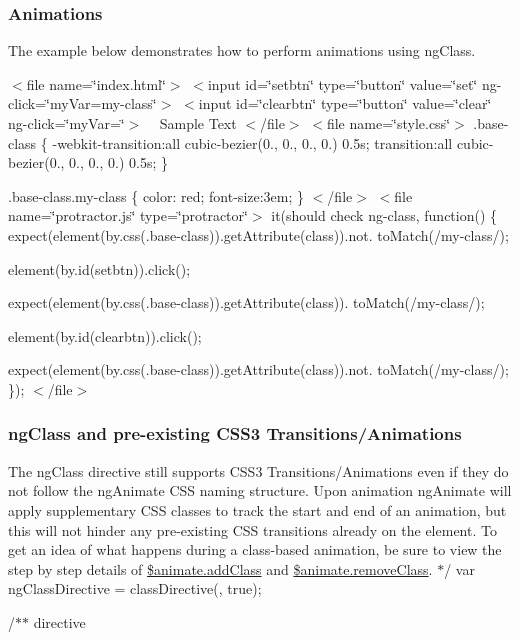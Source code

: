 \subsubsection*{Animations}

The example below demonstrates how to perform animations using ng\+Class.

$<$file name=\char`\"{}index.\+html\char`\"{}$>$ $<$input id=\char`\"{}setbtn\char`\"{} type=\char`\"{}button\char`\"{} value=\char`\"{}set\char`\"{} ng-\/click=\char`\"{}my\+Var=\textquotesingle{}my-\/class\textquotesingle{}\char`\"{}$>$ $<$input id=\char`\"{}clearbtn\char`\"{} type=\char`\"{}button\char`\"{} value=\char`\"{}clear\char`\"{} ng-\/click=\char`\"{}my\+Var=\textquotesingle{}\textquotesingle{}\char`\"{}$>$ ~\newline
 Sample Text $<$/file$>$ $<$file name=\char`\"{}style.\+css\char`\"{}$>$ .base-\/class \{ -\/webkit-\/transition\+:all cubic-\/bezier(0., 0., 0., 0.) 0.\+5s; transition\+:all cubic-\/bezier(0., 0., 0., 0.) 0.\+5s; \}

.base-\/class.\+my-\/class \{ color\+: red; font-\/size\+:3em; \} $<$/file$>$ $<$file name=\char`\"{}protractor.\+js\char`\"{} type=\char`\"{}protractor\char`\"{}$>$ it(\textquotesingle{}should check ng-\/class\textquotesingle{}, function() \{ expect(element(by.\+css(\textquotesingle{}.base-\/class\textquotesingle{})).get\+Attribute(\textquotesingle{}class\textquotesingle{})).not. to\+Match(/my-\/class/);

element(by.\+id(\textquotesingle{}setbtn\textquotesingle{})).click();

expect(element(by.\+css(\textquotesingle{}.base-\/class\textquotesingle{})).get\+Attribute(\textquotesingle{}class\textquotesingle{})). to\+Match(/my-\/class/);

element(by.\+id(\textquotesingle{}clearbtn\textquotesingle{})).click();

expect(element(by.\+css(\textquotesingle{}.base-\/class\textquotesingle{})).get\+Attribute(\textquotesingle{}class\textquotesingle{})).not. to\+Match(/my-\/class/); \}); $<$/file$>$ 

\subsubsection*{ng\+Class and pre-\/existing C\+S\+S3 Transitions/\+Animations}

The ng\+Class directive still supports C\+S\+S3 Transitions/\+Animations even if they do not follow the ng\+Animate C\+S\+S naming structure. Upon animation ng\+Animate will apply supplementary C\+S\+S classes to track the start and end of an animation, but this will not hinder any pre-\/existing C\+S\+S transitions already on the element. To get an idea of what happens during a class-\/based animation, be sure to view the step by step details of \hyperlink{}{\$animate.\+add\+Class} and \hyperlink{}{\$animate.\+remove\+Class}. $\ast$/ var ng\+Class\+Directive = class\+Directive(\textquotesingle{}\textquotesingle{}, true);

/$\ast$$\ast$  directive


\begin{DoxyCodeInclude}
\end{DoxyCodeInclude}
 
